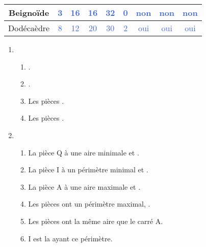 \begin{center}
{\begin{tabular}{|C{2.5}|*{4}{C{0.9}|}*{4}{C{1.5}|}}
            \hline
            Beignoïde & \textcolor{RoyalBlue}{3} & \textcolor{RoyalBlue}{16} & \textcolor{RoyalBlue}{16} & \textcolor{RoyalBlue}{32} & \textcolor{RoyalBlue}{0} & \textcolor{RoyalBlue}{non} & \textcolor{RoyalBlue}{non} & \textcolor{RoyalBlue}{non} \\
            \hline
            Dodécaèdre & \textcolor{RoyalBlue}{8} & \textcolor{RoyalBlue}{12} & \textcolor{RoyalBlue}{20} & \textcolor{RoyalBlue}{30} & \textcolor{RoyalBlue}{2} & \textcolor{RoyalBlue}{oui} & \textcolor{RoyalBlue}{oui} & \textcolor{RoyalBlue}{oui} \\
            \hline    
        \end{tabular}}
    \end{center}

\vfill



    \begin{enumerate}
        \item 
            \begin{enumerate}
                \item {}.
                \item {}.
                \item Les pièces .
                \item Les pièces .
            \end{enumerate}
        \item 
            \begin{enumerate}
                \item La pièce Q à une aire minimale et .
                \item La pièce I à un périmètre minimal et .
                \item La pièce A à une aire maximale et .
                \item Les pièces  ont un périmètre maximal, .
                \item Les pièces  ont la même aire que le carré A.
                \item I est la  ayant ce périmètre.
            \end{enumerate}
    \end{enumerate}

